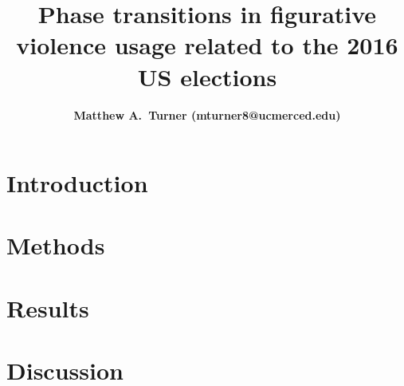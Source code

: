 \documentclass[11pt,letterpaper]{article}
\title{Phase transitions in figurative violence usage related to the 2016 US elections}
\author{{\large \bf Matthew A.~Turner (mturner8@ucmerced.edu)}}
\begin{document}
\maketitle


\begin{abstract}

\end{abstract}

\section{Introduction}


\section{Methods}
\label{sec:Methods}


\section{Results}
\label{sec:Results}


\section{Discussion}





\setlength{\bibleftmargin}{.125in}
\setlength{\bibindent}{-\bibleftmargin}


\end{document}

